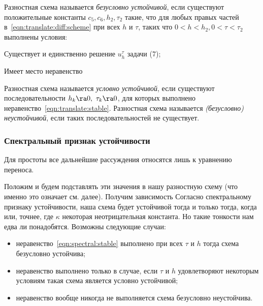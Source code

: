 \documentclass[a4paper]{article}
\begin{document}
\begin{df}
Разностная схема называется \emph{безусловно устойчивой}, если
существуют положительные константы $c_5, c_6, h_2, \tau_2$ такие, что
для любых правых частей в~\eqref{eqn:translate:diff:scheme} при всех
$h$ и $\tau$, таких что $0<h<h_2, 0<\tau<\tau_2$ выполнены условия:

\begin{nums}{-3}
\item Существует и единственно решение $u_h^{\tau}$ задачи (7);
\item Имеет место неравенство
\end{nums}
\end{df}

Разностная схема называется \emph{условно устойчивой}, если существуют
последовательности $h_k\ra0,\ \tau_k\ra0$, для которых выполнено
неравенство~\eqref{eqn:translate:stable}. Разностная схема называется
\emph{(безусловно) неустойчивой}, если таких последовательностей не
существует.

\subsubsection{Спектральный признак устойчивости}

Для простоты все дальнейшие рассуждения относятся лишь к уравнению
переноса.

Положим  и будем
подставлять эти значения в нашу разностную схему (что именно это
означает см. далее).  Получим зависимость  Согласно спектральному признаку устойчивости, наша схема
будет устойчивой тогда и только тогда, когда
 или, точнее,
 где $\kappa$ некоторая неотрицательная
константа. Но такие тонкости нам едва ли понадобятся. Возможны
следующие случаи:
\begin{itemize}
  \item неравенство~\eqref{eqn:spectral:stable} выполнено при всех
    $\tau$ и $h$ тогда схема безусловно устойчива;
  \item неравенство выполнено только в случае, если $\tau$ и $h$
    удовлетворяют некоторым условиям такая схема является условно
    устойчивой;
  \item неравенство вообще никогда не выполняется схема безусловно
    неустойчива.
\end{itemize}
\end{document}
